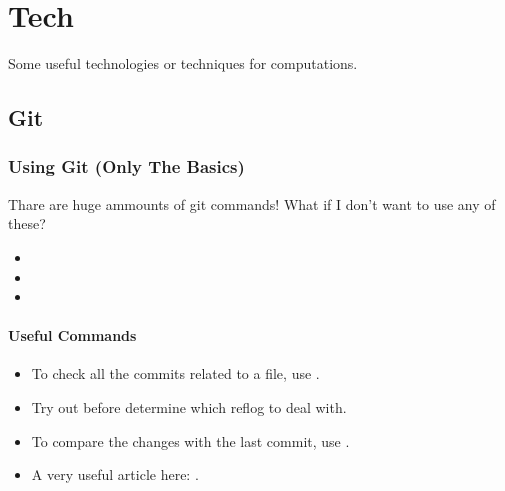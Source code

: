 \documentclass[letterpaper,12pt,english]{sphinxmanual}
\begin{document}
\chapter{Tech}
\label{\detokenize{tools/index::doc}}\label{\detokenize{tools/index:tech}}
Some useful technologies or techniques for computations.


\section{Git}
\label{\detokenize{tools/git::doc}}\label{\detokenize{tools/git:git}}

\subsection{Using Git (Only The Basics)}
\label{\detokenize{tools/git:using-git-only-the-basics}}
Thare are huge ammounts of git commands! What if I don't want to use any of these?
\begin{itemize}
\item {} 

\item {} 

\item {} 

\end{itemize}


\subsubsection{Useful Commands}
\label{\detokenize{tools/git:useful-commands}}\begin{itemize}
\item {} 
To check all the commits related to a file, use .

\item {} 
Try out  before determine which reflog to deal with.

\item {} 
To compare the changes with the last commit, use
.

\item {} 
A very useful article here: .

\end{itemize}
\end{document}

